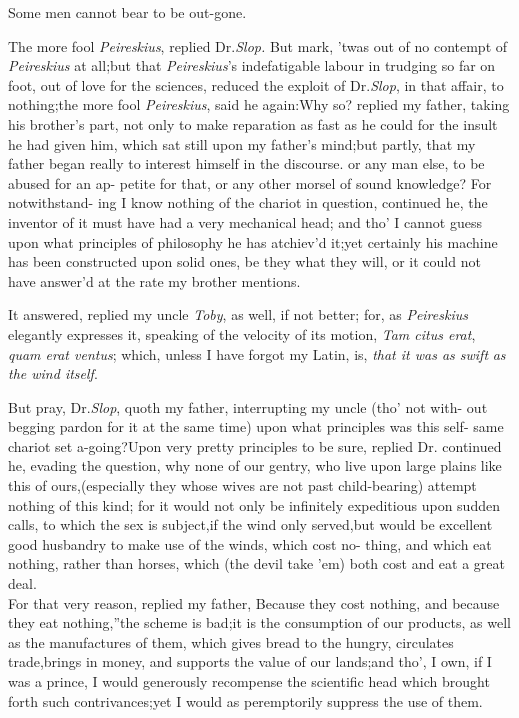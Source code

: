 \documentclass{article}
\begin{document}
Some men cannot bear to be out-gone.

The more fool \textit{Peireskius}, replied Dr.\@ \textit{Slop.} But
mark, ’twas out of no contempt of \textit{Peireskius} at
all;\tsh but that \textit{Peireskius}’s indefatigable labour in
trudging so far on foot, out of love for the sciences, reduced the
exploit of Dr.\@ \textit{Slop}, in that affair, to nothing;\tsk the
more fool \textit{Peireskius}, said he again:\tsk Why so?\tsk\break
replied my father, taking his brother’s part, not
only to make reparation as fast as he could for the insult he had
given him, which sat still upon my father’s\break
mind;\tsk but partly, that my father began really to
interest himself in the discourse.
or any man else, to be abused for an ap-
petite for that, or any other morsel of
sound knowledge? For notwithstand-\break
ing I know nothing of the chariot in\break
question, continued he, the inventor of it must have had a very mechanical head;\break
and tho’ I cannot guess upon what prin\-ciples of philosophy he has atchiev’d\break
it;\tsh yet certainly his machine has\break
been constructed upon solid ones, be\break
they what they will, or it could not\break
have answer’d at the rate my brother\break
mentions.

It answered, replied my uncle \textit{Toby},\break
as well, if not better; for, as \textit{Peireskius}\break
elegantly expresses it, speaking of the\break
velocity of its motion, \textit{Tam citus erat},\break
\textit{quam erat ventus}; which, unless I have\break
forgot my Latin, is, \textit{that it was as swift}\break 
\textit{as the wind itself}.

But pray, Dr.\@ \textit{Slop}, quoth my father,\break
interrupting my uncle (tho’ not with-\break
out begging pardon for it at the same
time) upon what principles was this self-\break
same chariot set a-going?\tsk Upon very pretty principles to be sure, replied
Dr.\break
{}\break
continued he, evading
the question, why none of our gentry, who live upon large plains
like this of ours,\tsk (especially they whose wives are not past
child-bearing) attempt nothing of this kind; for it would not only
be infinitely expeditious upon sudden calls, to which the sex is
subject,\tsk if the wind only served,\tsk but would be
excellent good husbandry to make use of the winds, which cost
no-\break
thing, and which eat nothing, rather\break
than horses, which (the devil take ’em)\break 
both cost and eat a great deal.\\
\newpage
For that very reason, replied my father,
\lqq Because they cost nothing, and\break
\lqq because they eat nothing,”\tsk the scheme\break
is bad;\tsk it is the
consumption of our products, as well as the manufactures of them,
which gives bread to the hungry, circulates trade,\tsk brings in
money, and supports the value of our lands;\tsk and tho’, I
own, if I was a prince, I would
ge\-nerously recompense the scientific head which brought
forth such contrivances;\break\tsk yet I
would as peremptorily suppress the use of them.
\end{document}
